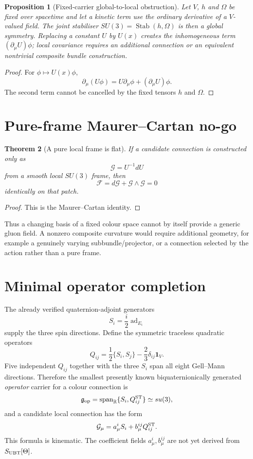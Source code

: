 \documentclass[11pt,a4paper]{article}
\newtheorem{theorem}{Theorem}
\newtheorem{proposition}[theorem]{Proposition}
\begin{document}
\begin{proposition}[Fixed-carrier global-to-local obstruction]
Let $V$, $h$ and $\Omega$ be fixed over spacetime and let a kinetic term use
the ordinary derivative of a $V$-valued field.  The joint stabiliser
$SU(3)=\operatorname{Stab}(h,\Omega)$ is then a global symmetry.  Replacing a
constant $U$ by $U(x)$ creates the inhomogeneous term
$(\partial_\mu U)\phi$; local covariance requires an additional connection or
an equivalent nontrivial composite bundle construction.
\end{proposition}

\begin{proof}
For $\phi\mapsto U(x)\phi$,
\[
 \partial_\mu(U\phi)
 =U\partial_\mu\phi+(\partial_\mu U)\phi.
\]
The second term cannot be cancelled by the fixed tensors $h$ and $\Omega$.
\end{proof}

\section{Pure-frame Maurer--Cartan no-go}

\begin{theorem}[A pure local frame is flat]
If a candidate connection is constructed only as
\[
 \mathcal G=U^{-1}dU
\]
from a smooth local $SU(3)$ frame, then
\[
 \boxed{\mathcal F=d\mathcal G+\mathcal G\wedge\mathcal G=0}
\]
identically on that patch.
\end{theorem}

\begin{proof}
This is the Maurer--Cartan identity.
\end{proof}

Thus a changing basis of a fixed colour space cannot by itself provide a
generic gluon field.  A nonzero composite curvature would require additional
geometry, for example a genuinely varying subbundle/projector, or a
connection selected by the action rather than a pure frame.

\section{Minimal operator completion}

The already verified quaternion-adjoint generators
\[
 S_i=\frac{i}{2}\operatorname{ad}_{E_i}
\]
supply the three spin directions.  Define the symmetric traceless quadratic
operators
\[
 Q_{ij}=\frac12\{S_i,S_j\}-\frac23\delta_{ij}\mathbf1_V.
\]
Five independent $Q_{ij}$ together with the three $S_i$ span all eight
Gell--Mann directions.  Therefore the smallest presently known
biquaternionically generated \emph{operator} carrier for a colour connection
is
\[
 \mathfrak g_{\rm op}
 =\operatorname{span}_{\mathbb R}\{S_i,Q_{ij}^{\rm ST}\}\simeq su(3),
\]
and a candidate local connection has the form
\[
 \mathcal G_\mu
 =a_\mu^iS_i+b_\mu^{ij}Q_{ij}^{\rm ST}.
\]
This formula is kinematic.  The coefficient fields $a_\mu^i,b_\mu^{ij}$ are
not yet derived from $S_{\rm UBT}[\Theta]$.
\end{document}
